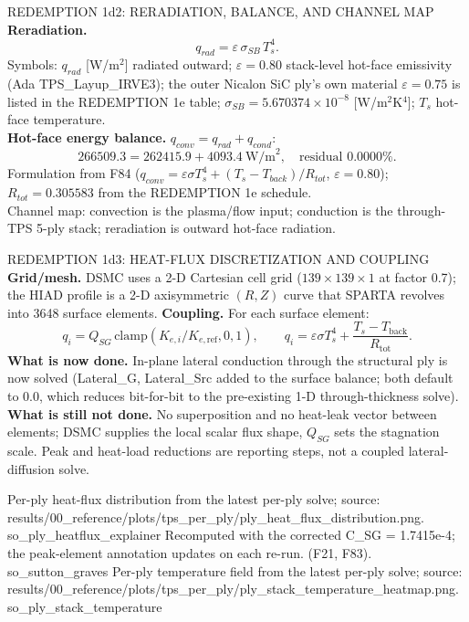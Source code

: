 \documentclass[aspectratio=169,11pt]{beamer}
\begin{document}
\begin{frame}{REDEMPTION 1d2: RERADIATION, BALANCE, AND CHANNEL MAP}
  \small
  \textbf{Reradiation.}
  \[
    q_{rad}=\varepsilon\,\sigma_{SB}\,T_s^4.
  \]
  Symbols: $q_{rad}$ [W/m$^2$] radiated outward; $\varepsilon=0.80$ stack-level
  hot-face emissivity (Ada TPS\_Layup\_IRVE3); the outer Nicalon SiC ply's own
  material $\varepsilon=0.75$ is listed in the REDEMPTION 1e table;
  $\sigma_{SB}=5.670374\times10^{-8}$ [W/m$^2$K$^4$]; $T_s$ hot-face
  temperature. \\

  \textbf{Hot-face energy balance.} $q_{conv}=q_{rad}+q_{cond}$:
  \[
    266509.3=262415.9+4093.4\ \text{W/m}^2,\quad
    \text{residual }0.0000\%.
  \]
  Formulation from F84 ($q_{conv}=\varepsilon\sigma T_s^4+(T_s-T_{back})/R_{tot}$,
  $\varepsilon=0.80$); $R_{tot}=0.305583$ from the REDEMPTION 1e schedule. \\

  Channel map: convection is the plasma/flow input; conduction is the
  through-TPS 5-ply stack; reradiation is outward hot-face radiation.
\end{frame}

\begin{frame}{REDEMPTION 1d3: HEAT-FLUX DISCRETIZATION AND COUPLING}
  \small
  \textbf{Grid/mesh.} DSMC uses a 2-D Cartesian cell grid
  ($139\times139\times1$ at factor 0.7); the HIAD profile is a 2-D
  axisymmetric $(R,Z)$ curve that SPARTA revolves into 3648 surface elements.
  \textbf{Coupling.} For each surface element:
  \[
    q_i=Q_{SG}\,\mathrm{clamp}(K_{e,i}/K_{e,\mathrm{ref}},0,1),
    \qquad
    q_i=\varepsilon\sigma T_s^4+\frac{T_s-T_{\mathrm{back}}}{R_{\mathrm{tot}}}.
  \]
  \textbf{What is now done.} In-plane lateral conduction through the
  structural ply is now solved (Lateral\_G, Lateral\_Src added to the surface
  balance; both default to 0.0, which reduces bit-for-bit to the pre-existing
  1-D through-thickness solve). \textbf{What is still not done.} No
  superposition and no heat-leak vector between elements; DSMC supplies the
  local scalar flux shape, $Q_{SG}$ sets the stagnation scale. Peak and
  heat-load reductions are reporting steps, not a coupled
  lateral-diffusion solve.
\end{frame}

  {%
   Per-ply heat-flux distribution from the latest per-ply solve; source:
   results/00\_reference/plots/tps\_per\_ply/ply\_heat\_flux\_distribution.png.}
  {so_ply_heatflux_explainer}
  {%
   Recomputed with the corrected C\_SG = 1.7415e-4; the peak-element
   annotation updates on each re-run. (F21, F83).}
  {so_sutton_graves}
  {%
   Per-ply temperature field from the latest per-ply solve; source:
   results/00\_reference/plots/tps\_per\_ply/ply\_stack\_temperature\_heatmap.png.}
  {so_ply_stack_temperature}
\end{document}
